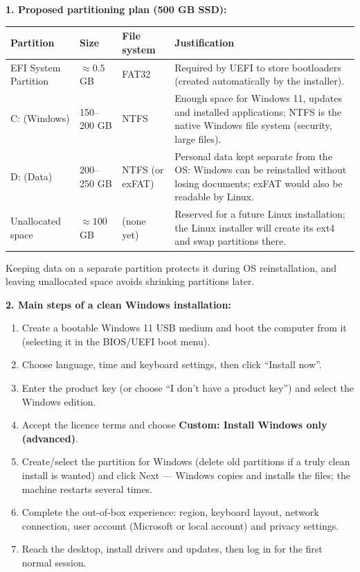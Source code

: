 \documentclass[11pt]{article}
\begin{document}
\begin{corrige}
\textbf{1. Proposed partitioning plan (500 GB SSD):}
\begin{center}
\begin{tabularx}{\linewidth}{|l|l|l|X|}
\hline
\rowcolor{popblueL} \textbf{Partition} & \textbf{Size} & \textbf{File system} & \textbf{Justification} \\
\hline
EFI System Partition & $\approx 0.5$ GB & FAT32 & Required by UEFI to store bootloaders (created automatically by the installer). \\
\hline
C: (Windows) & 150--200 GB & NTFS & Enough space for Windows 11, updates and installed applications; NTFS is the native Windows file system (security, large files). \\
\hline
D: (Data) & 200--250 GB & NTFS (or exFAT) & Personal data kept separate from the OS: Windows can be reinstalled without losing documents; exFAT would also be readable by Linux. \\
\hline
Unallocated space & $\approx 100$ GB & (none yet) & Reserved for a future Linux installation; the Linux installer will create its ext4 and swap partitions there. \\
\hline
\end{tabularx}
\end{center}
Keeping data on a separate partition protects it during OS reinstallation, and leaving unallocated space avoids shrinking partitions later.

\textbf{2. Main steps of a clean Windows installation:}
\begin{enumerate}
\item Create a bootable Windows 11 USB medium and boot the computer from it (selecting it in the BIOS/UEFI boot menu).
\item Choose language, time and keyboard settings, then click ``Install now''.
\item Enter the product key (or choose ``I don't have a product key'') and select the Windows edition.
\item Accept the licence terms and choose \textbf{Custom: Install Windows only (advanced)}.
\item Create/select the partition for Windows (delete old partitions if a truly clean install is wanted) and click Next — Windows copies and installs the files; the machine restarts several times.
\item Complete the out-of-box experience: region, keyboard layout, network connection, user account (Microsoft or local account) and privacy settings.
\item Reach the desktop, install drivers and updates, then log in for the first normal session.
\end{enumerate}
\end{corrige}
\end{document}
